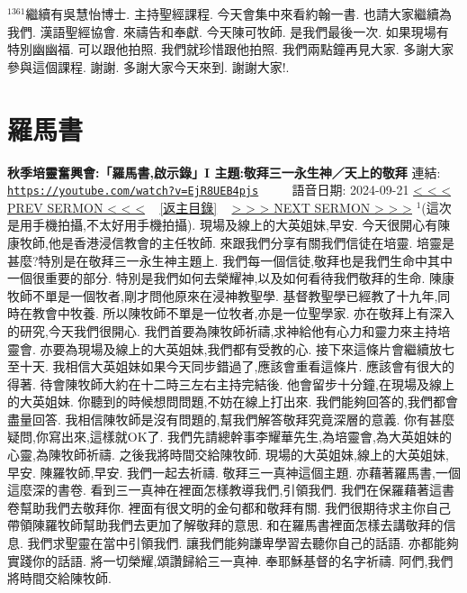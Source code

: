 \documentclass{book}
\begin{document}
$^{1361}$繼續有吳慧怡博士.
主持聖經課程.
今天會集中來看約翰一書.
也請大家繼續為我們.
漢語聖經協會.
來禱告和奉獻.
今天陳可牧師.
是我們最後一次.
如果現場有特別幽幽福.
可以跟他拍照.
我們就珍惜跟他拍照.
我們兩點鐘再見大家.
多謝大家參與這個課程.
謝謝.
多謝大家今天來到.
謝謝大家!.
\newpage



\section{羅馬書}
\label{sec:EjR8UEB4pjs}
\textbf{秋季培靈奮興會:「羅馬書,啟示錄」I 主題:敬拜三一永生神／天上的敬拜}
\newline
\newline
連結: \href{https://youtube.com/watch?v=EjR8UEB4pjs}{\texttt{https://youtube.com/watch?v=EjR8UEB4pjs}} ~~~~ 語音日期: 2024-09-21
\newline
\newline
\hyperref[sec:uvYtXSSsYt0]{\small{< < < PREV SERMON < < <}}
~
\hyperref[sec:index]{\small{[返主目錄]}}
~
\hyperref[sec:ltLox1aivp8]{\small{> > > NEXT SERMON > > >}}
\newline
\newline
$^{1}$(這次是用手機拍攝,不太好用手機拍攝).
現場及線上的大英姐妹,早安.
今天很開心有陳康牧師,他是香港浸信教會的主任牧師.
來跟我們分享有關我們信徒在培靈.
培靈是甚麼?特別是在敬拜三一永生神主題上.
我們每一個信徒,敬拜也是我們生命中其中一個很重要的部分.
特別是我們如何去榮耀神,以及如何看待我們敬拜的生命.
陳康牧師不單是一個牧者,剛才問他原來在浸神教聖學.
基督教聖學已經教了十九年,同時在教會中牧養.
所以陳牧師不單是一位牧者,亦是一位聖學家.
亦在敬拜上有深入的研究,今天我們很開心.
我們首要為陳牧師祈禱,求神給他有心力和靈力來主持培靈會.
亦要為現場及線上的大英姐妹,我們都有受教的心.
接下來這條片會繼續放七至十天.
我相信大英姐妹如果今天同步錯過了,應該會重看這條片.
應該會有很大的得著.
待會陳牧師大約在十二時三左右主持完結後.
他會留步十分鐘,在現場及線上的大英姐妹.
你聽到的時候想問問題,不妨在線上打出來.
我們能夠回答的,我們都會盡量回答.
我相信陳牧師是沒有問題的,幫我們解答敬拜究竟深層的意義.
你有甚麼疑問,你寫出來,這樣就OK了.
我們先請總幹事李耀華先生,為培靈會,為大英姐妹的心靈,為陳牧師祈禱.
之後我將時間交給陳牧師.
現場的大英姐妹,線上的大英姐妹,早安.
陳羅牧師,早安.
我們一起去祈禱.
敬拜三一真神這個主題.
亦藉著羅馬書,一個這麼深的書卷.
看到三一真神在裡面怎樣教導我們,引領我們.
我們在保羅藉著這書卷幫助我們去敬拜你.
裡面有很文明的金句都和敬拜有關.
我們很期待求主你自己帶領陳羅牧師幫助我們去更加了解敬拜的意思.
和在羅馬書裡面怎樣去講敬拜的信息.
我們求聖靈在當中引領我們.
讓我們能夠謙卑學習去聽你自己的話語.
亦都能夠實踐你的話語.
將一切榮耀,頌讚歸給三一真神.
奉耶穌基督的名字祈禱.
阿們,我們將時間交給陳牧師.
\end{document}
